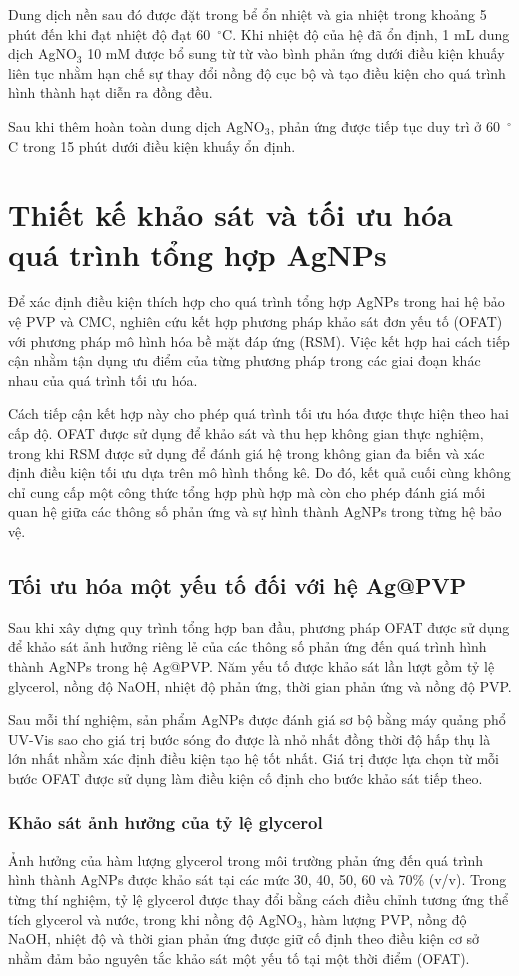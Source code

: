 Dung dịch nền sau đó được đặt trong bể ổn nhiệt và gia nhiệt trong khoảng 5 phút đến khi đạt nhiệt độ đạt 60~$^\circ$C. 
Khi nhiệt độ của hệ đã ổn định, 1 mL dung dịch AgNO$_3$ 10 mM được bổ sung từ từ vào bình phản ứng dưới điều kiện khuấy liên tục nhằm hạn chế sự thay đổi nồng độ cục bộ và tạo điều kiện cho quá trình hình thành hạt diễn ra đồng đều.

Sau khi thêm hoàn toàn dung dịch AgNO$_3$, phản ứng được tiếp tục duy trì ở 60~$^\circ$C trong 15 phút dưới điều kiện khuấy ổn định.

\section{Thiết kế khảo sát và tối ưu hóa quá trình tổng hợp AgNPs}
Để xác định điều kiện thích hợp cho quá trình tổng hợp AgNPs trong hai hệ bảo vệ PVP và CMC, nghiên cứu kết hợp phương pháp khảo sát đơn yếu tố (OFAT) với phương pháp mô hình hóa bề mặt đáp ứng (RSM).
Việc kết hợp hai cách tiếp cận nhằm tận dụng ưu điểm của từng phương pháp trong các giai đoạn khác nhau của quá trình tối ưu hóa.

Cách tiếp cận kết hợp này cho phép quá trình tối ưu hóa được thực hiện theo hai cấp độ.
OFAT được sử dụng để khảo sát và thu hẹp không gian thực nghiệm, trong khi RSM được sử dụng để đánh giá hệ trong không gian đa biến và xác định điều kiện tối ưu dựa trên mô hình thống kê.
Do đó, kết quả cuối cùng không chỉ cung cấp một công thức tổng hợp phù hợp mà còn cho phép đánh giá mối quan hệ giữa các thông số phản ứng và sự hình thành AgNPs trong từng hệ bảo vệ.

\subsection{Tối ưu hóa một yếu tố đối với hệ Ag@PVP}
Sau khi xây dựng quy trình tổng hợp ban đầu, phương pháp OFAT được sử dụng để khảo sát ảnh hưởng riêng lẻ của các thông số phản ứng đến quá trình hình thành AgNPs trong hệ Ag@PVP.
Năm yếu tố được khảo sát lần lượt gồm tỷ lệ glycerol, nồng độ NaOH, nhiệt độ phản ứng, thời gian phản ứng và nồng độ PVP.

Sau mỗi thí nghiệm, sản phẩm AgNPs được đánh giá sơ bộ bằng máy quảng phổ UV-Vis sao cho giá trị bước sóng đo được là nhỏ nhất đồng thời độ hấp thụ là lớn nhất nhằm xác định điều kiện tạo hệ tốt nhất.
Giá trị được lựa chọn từ mỗi bước OFAT được sử dụng làm điều kiện cố định cho bước khảo sát tiếp theo.

\subsubsection{Khảo sát ảnh hưởng của tỷ lệ glycerol}
Ảnh hưởng của hàm lượng glycerol trong môi trường phản ứng đến quá trình hình thành AgNPs được khảo sát tại các mức 30, 40, 50, 60 và 70\% (v/v). 
Trong từng thí nghiệm, tỷ lệ glycerol được thay đổi bằng cách điều chỉnh tương ứng thể tích glycerol và nước, trong khi nồng độ AgNO$_3$, hàm lượng PVP, nồng độ NaOH, nhiệt độ và thời gian phản ứng được giữ cố định theo điều kiện cơ sở nhằm đảm bảo nguyên tắc khảo sát một yếu tố tại một thời điểm (OFAT).


